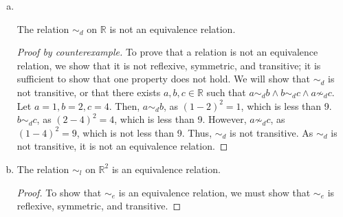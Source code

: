 \documentclass[11pt]{scrartcl}
\theoremstyle{dotlessP}
\theoremstyle{dotlessN}
\DeclarePairedDelimiter\set{\{}{\}}
\newcommand{\reals}{\mathbb{R}} %
\newcommand{\ints}{\mathbb{Z}}
\begin{document}
\begin{enumerate}[(a)]
\begin{proof}
\begin{subproof}
		If $a-b$ is even, then the difference of $a$ and $b$ can be represented by $2k, k \in \ints$. If $b - c$ is even, then the difference of $b$ and $c$ can be represented by $2d, d \in \ints$. Thus,  $a - b = 2k$ and $b - c = 2d$. It follows that $b = a - 2k$. We substitute this value for $b$ to get the equation $a - 2k - c = 2d$. Thus, $a - c = 2d + 2k = 2(d+k)$. Let  $d + k = t$. Then, $a - c = 2t$. As the difference of $a$ and $c$ can be represented as $2t, t \in \ints$, by definition of even number, $a - c$ is even, and thus $a \sim_e c$. Thus, the relation $\sim_e$ on $\reals$ is transitive.
	\end{subproof}
		As the relation $\sim_e$ is reflexive, symmetric, and transitive, it is an equivalence relation.
		\end{proof}
		\textbf{The equivalence classes are:}
\begin{itemize}
	\item $\set*{2k \mid k \in \ints}$
	\item $\set*{2k + 1 \mid k \in \ints}$
\end{itemize}
	\item \
		\begin{claim*}
			The relation $\sim_d$ on $\reals$ is not an equivalence relation.
		\end{claim*}
		\begin{proof}
			[Proof by counterexample]
			To prove that a relation is not an equivalence relation, we show that it is not reflexive, symmetric, and transitive; it is sufficient to show that one property does not hold. We will show that $\sim_d$ is not transitive, or that there exists $a,b,c \in \reals$ such that $a \sim_d b \land b \sim_d c \land a \not\sim_d c$.
			\\
			
			Let $a = 1, b = 2, c = 4$. Then, $a \sim_d b$, as $(1-2)^2 = 1$, which is less than 9. $b \sim_d c$, as $(2-4)^2 = 4$, which is less than 9. However, $a \not\sim_d c$, as $(1-4)^2 = 9$, which is not less than 9. Thus, $\sim_d$ is not transitive. As $\sim_d$ is not transitive, it is not an equivalence relation.
		\end{proof}
	\item 
		\begin{claim*}
			The relation  $\sim_l$ on $\reals^2$ is an equivalence relation.	
		\end{claim*}
		\begin{proof}
To show that $\sim_e$ is an equivalence relation, we must show that $\sim_e$ is reflexive, symmetric, and transitive.


\end{proof}
\end{enumerate}
\end{document}
